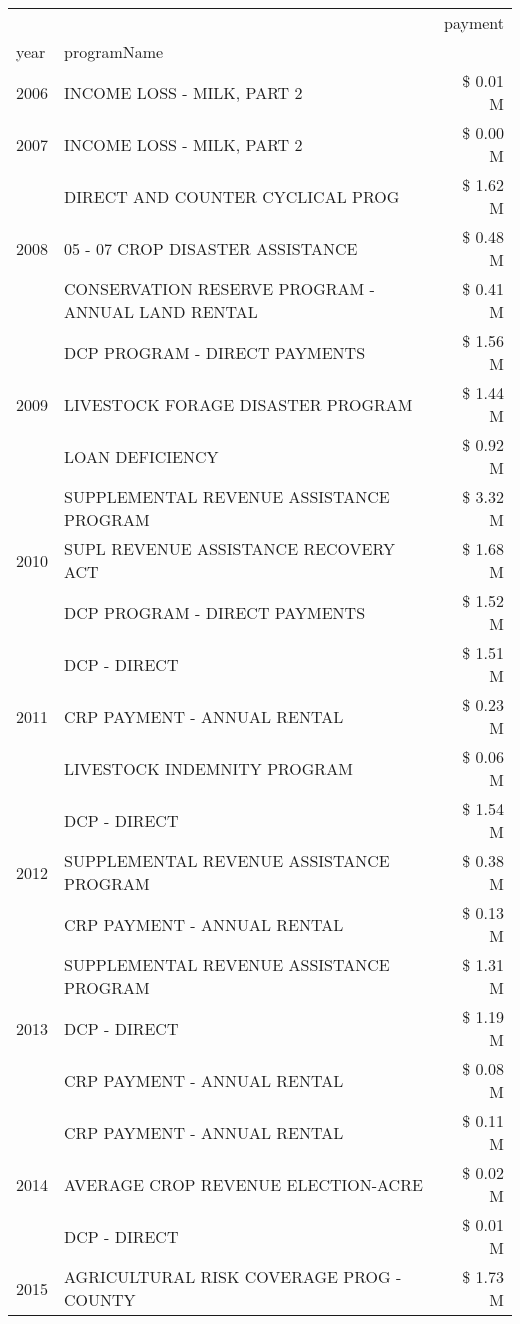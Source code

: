 \begin{tabular}{llr}
\toprule
 &  & payment \\
year & programName &  \\
\midrule
2006 & INCOME LOSS - MILK, PART 2 & \$ 0.01 M \\
\cline{1-3}
2007 & INCOME LOSS - MILK, PART 2 & \$ 0.00 M \\
\cline{1-3}
\multirow[t]{3}{*}{2008} & DIRECT AND COUNTER CYCLICAL PROG & \$ 1.62 M \\
 & 05 - 07 CROP DISASTER ASSISTANCE & \$ 0.48 M \\
 & CONSERVATION RESERVE PROGRAM - ANNUAL LAND RENTAL & \$ 0.41 M \\
\cline{1-3}
\multirow[t]{3}{*}{2009} & DCP PROGRAM - DIRECT PAYMENTS & \$ 1.56 M \\
 & LIVESTOCK FORAGE DISASTER  PROGRAM & \$ 1.44 M \\
 & LOAN DEFICIENCY & \$ 0.92 M \\
\cline{1-3}
\multirow[t]{3}{*}{2010} & SUPPLEMENTAL REVENUE ASSISTANCE PROGRAM & \$ 3.32 M \\
 & SUPL REVENUE ASSISTANCE RECOVERY ACT & \$ 1.68 M \\
 & DCP PROGRAM - DIRECT PAYMENTS & \$ 1.52 M \\
\cline{1-3}
\multirow[t]{3}{*}{2011} & DCP - DIRECT & \$ 1.51 M \\
 & CRP PAYMENT - ANNUAL RENTAL & \$ 0.23 M \\
 & LIVESTOCK INDEMNITY PROGRAM & \$ 0.06 M \\
\cline{1-3}
\multirow[t]{3}{*}{2012} & DCP - DIRECT & \$ 1.54 M \\
 & SUPPLEMENTAL REVENUE ASSISTANCE PROGRAM & \$ 0.38 M \\
 & CRP PAYMENT - ANNUAL RENTAL & \$ 0.13 M \\
\cline{1-3}
\multirow[t]{3}{*}{2013} & SUPPLEMENTAL REVENUE ASSISTANCE PROGRAM & \$ 1.31 M \\
 & DCP - DIRECT & \$ 1.19 M \\
 & CRP PAYMENT - ANNUAL RENTAL & \$ 0.08 M \\
\cline{1-3}
\multirow[t]{3}{*}{2014} & CRP PAYMENT - ANNUAL RENTAL & \$ 0.11 M \\
 & AVERAGE CROP REVENUE ELECTION-ACRE & \$ 0.02 M \\
 & DCP - DIRECT & \$ 0.01 M \\
\cline{1-3}
\multirow[t]{3}{*}{2015} & AGRICULTURAL RISK COVERAGE PROG - COUNTY & \$ 1.73 M \\

\end{tabular}

